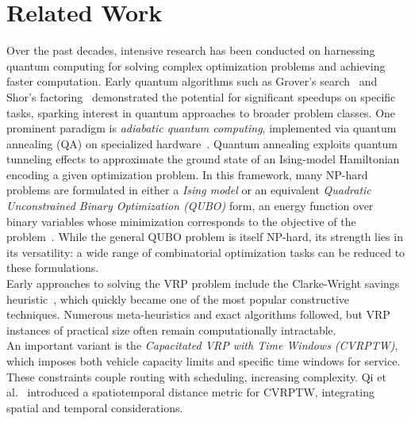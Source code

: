 \documentclass[conference]{IEEEtran}
\begin{document}
\section{Related Work}




Over the past decades, intensive research has been conducted on harnessing quantum computing for solving complex optimization problems and achieving faster computation. Early quantum algorithms such as Grover’s search~\cite{grover1996} and Shor’s factoring~\cite{shor1997} demonstrated the potential for significant speedups on specific tasks, sparking interest in quantum approaches to broader problem classes. One prominent paradigm is \emph{adiabatic quantum computing}, implemented via quantum annealing (QA) on specialized hardware~\cite{kadowaki1998,farhi2000}. Quantum annealing exploits quantum tunneling effects to approximate the ground state of an Ising-model Hamiltonian encoding a given optimization problem. In this framework, many NP-hard problems are formulated in either a \emph{Ising model} or an equivalent \emph{Quadratic Unconstrained Binary Optimization (QUBO)} form, an energy function over binary variables whose minimization corresponds to the objective of the problem~\cite{kochenberger2014}. While the general QUBO problem is itself NP-hard, its strength lies in its versatility: a wide range of combinatorial optimization tasks can be reduced to these formulations. \\ 


Early approaches to solving the VRP problem include the Clarke-Wright savings heuristic~\cite{clarke1964}, which quickly became one of the most popular constructive techniques. Numerous meta-heuristics and exact algorithms followed, but VRP instances of practical size often remain computationally intractable.\\  An important variant is the \emph{Capacitated VRP with Time Windows (CVRPTW)}, which imposes both vehicle capacity limits and specific time windows for service. These constraints couple routing with scheduling, increasing complexity. Qi et al.~\cite{qi2011} introduced a spatiotemporal distance metric for CVRPTW, integrating spatial and temporal considerations. 
\end{document}
